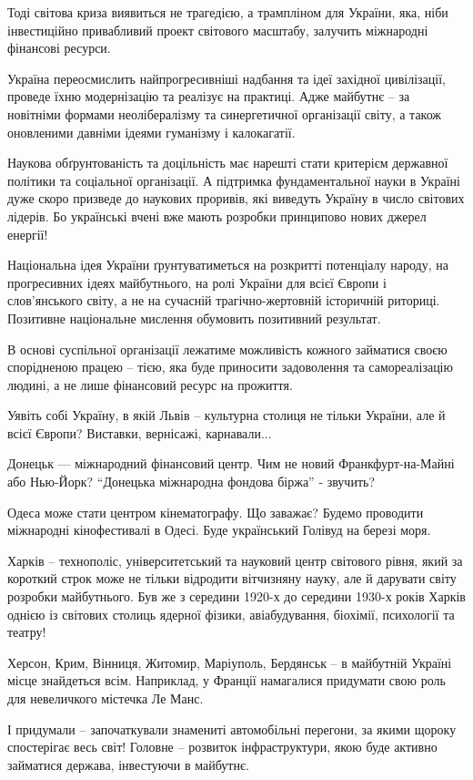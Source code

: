 \begin{multicols}{2}
Тоді світова криза виявиться не трагедією, а трампліном для України, яка, ніби
інвестиційно привабливий проект світового масштабу, залучить міжнародні
фінансові ресурси.

Україна переосмислить найпрогресивніші надбання та ідеї західної цивілізації,
проведе їхню модернізацію та реалізує на практиці. Адже майбутнє – за новітніми
формами неолібералізму та синергетичної організації світу, а також оновленими
давніми ідеями гуманізму і калокагатії.

Наукова обґрунтованість та доцільність має нарешті стати критерієм державної
політики та соціальної організації. А підтримка фундаментальної науки в Україні
дуже скоро призведе до наукових проривів, які виведуть Україну в число світових
лідерів. Бо українські вчені вже мають розробки принципово нових джерел
енергії!

Національна ідея України ґрунтуватиметься на розкритті потенціалу народу, на
прогресивних ідеях майбутнього, на ролі України для всієї Європи і
слов’янського світу, а не на сучасній трагічно-жертовній історичній риториці.
Позитивне національне мислення обумовить позитивний результат.

В основі суспільної організації лежатиме можливість кожного займатися своєю
спорідненою працею – тією, яка буде приносити задоволення та самореалізацію
людині, а не лише фінансовий ресурс на прожиття.

Уявіть собі Україну, в якій Львів – культурна столиця не тільки України, але й
всієї Європи? Виставки, вернісажі, карнавали...

Донецьк –– міжнародний фінансовий центр. Чим не новий Франкфурт-на-Майні або
Нью-Йорк? \enquote{Донецька міжнародна фондова біржа} - звучить?

Одеса може стати центром кінематографу. Що заважає? Будемо проводити міжнародні
кінофестивалі в Одесі. Буде український Голівуд на березі моря.

Харків – технополіс, університетський та науковий центр світового рівня, який
за короткий строк може не тільки відродити вітчизняну науку, але й дарувати
світу розробки майбутнього. Був же з середини 1920-х до середини 1930-х років
Харків однією із світових столиць ядерної фізики, авіабудування, біохімії,
психології та театру!

Херсон, Крим, Вінниця, Житомир, Маріуполь, Бердянськ – в майбутній Україні
місце знайдеться всім. Наприклад, у Франції намагалися придумати свою роль для
невеличкого містечка Ле Манс.

І придумали – започаткували знамениті автомобільні перегони, за якими щороку
спостерігає весь світ! Головне – розвиток інфраструктури, якою буде активно
займатися держава, інвестуючи в майбутнє.


\end{multicols}
